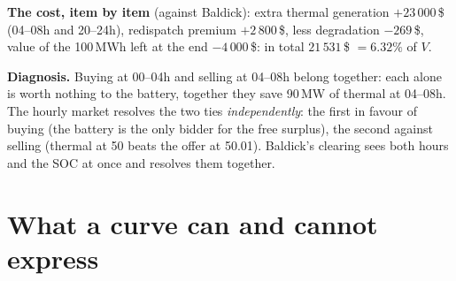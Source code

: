 \documentclass[10pt,a4paper]{article}
\begin{document}
\textbf{The cost, item by item} (against Baldick): extra thermal generation $+23\,000$\,\$ (04--08h and
20--24h), redispatch premium $+2\,800$\,\$, less degradation $-269$\,\$, value of the 100\,MWh left at the
end $-4\,000$\,\$: in total $21\,531$\,\$ $=6.32\%$ of $V$.

\textbf{Diagnosis.} Buying at 00--04h and selling at 04--08h belong together: each alone is worth nothing to
the battery, together they save 90\,MW of thermal at 04--08h. The hourly market resolves the two ties
\emph{independently}: the first in favour of buying (the battery is the only bidder for the free surplus), the
second against selling (thermal at 50 beats the offer at 50.01). Baldick's clearing sees both hours and the
SOC at once and resolves them together.

\section{What a curve can and cannot express}
\end{document}
